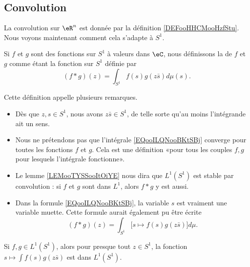 \subsection{Convolution}

La convolution sur \( \eR^n\) est donnée par la définition \ref{DEFooHHCMooHzfStu}. Nous voyons maintenant comment cela s'adapte à \( S^1\).
\begin{definition}      \label{DEFooSKWOooEdIHoH}
	Si \( f\) et \( g\) sont des fonctions sur \( S^1\) à valeurs dans \( \eC\), nous définissons la  de \( f\) et \( g\) comme étant la fonction sur \( S^1\) définie par
	\begin{equation}        \label{EQooILQNooBKtSBj}
		(f*g)(z)=\int_{S^1}f(s)g(z\bar s)d\mu(s).
	\end{equation}
\end{definition}

Cette définition appelle plusieurs remarques.
\begin{itemize}
	\item
	      Dès que \( z,s\in S^1\), nous avons \( z\bar s\in S^1\), de telle sorte qu'au moins l'intégrande ait un sens.
	\item Nous ne prétendons pas que l'intégrale \eqref{EQooILQNooBKtSBj} converge pour toutes les fonctions \( f\) et \( g\). Cela est une définition «pour tous les couples \( f,g\) pour lesquels l'intégrale fonctionne».
	\item
	      Le lemme \ref{LEMooTYSSooItOiYE} nous dira que \( L^1(S^1)\) est stable par convolution : si \( f\) et \( g\) sont dans \( L^1\), alors \( f*g\) y est aussi.
	\item
	      Dans la formule \eqref{EQooILQNooBKtSBj}, la variable \( s\) est vraiment une variable muette. Cette formule aurait également pu être écrite
	      \begin{equation}
		      (f*g)(z)=\int_{S^1} \big[ s\mapsto f(s)g(z\bar s) \big]d\mu.
	      \end{equation}
\end{itemize}

\begin{lemma}        \label{LEMooTYSSooItOiYE}
	Si \( f,g\in L^1(S^1)\), alors pour presque tout \( z\in S^1\), la fonction \( s\mapsto \int f(s)g(z\bar s)\) est dans \( L^1(S^1)\).
\end{lemma}

